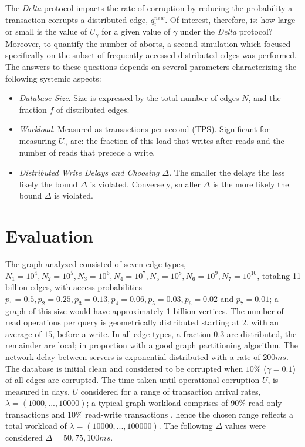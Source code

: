 \documentclass[sigplan,10pt]{acmart}
\begin{document}
The \emph{Delta} protocol impacts the rate of corruption by reducing the probability a transaction corrupts a distributed edge, $q^{new}_i$. Of interest, therefore, is: how large or small is the value of $U_\gamma$ for a given value of $\gamma$ under the \emph{Delta} protocol? Moreover, to quantify the number of aborts, a second simulation which focused specifically on the subset of frequently accessed distributed edges was performed. The answers to these questions depends on several parameters characterizing the following systemic aspects:
\begin{itemize}
\item \emph{Database Size}. Size is expressed by the total number of edges $N$, and the fraction $f$ of distributed edges.
\item \emph{Workload}. Measured as transactions per second (TPS). Significant for measuring $U_{\gamma}$ are: the fraction of this load that writes after reads and the number of reads that precede a write.
\item \emph{Distributed Write Delays and Choosing $\Delta$}. The smaller the delays the less likely the bound $\Delta$ is violated. Conversely, smaller $\Delta$ is the more likely the bound $\Delta$ is violated.
\end{itemize}

\section{Evaluation}
\label{sec:evaluation}

The graph analyzed consisted of seven edge types, $N_1=10^4, N_2=10^5, N_3=10^6, N_4=10^7,  N_5=10^8, N_6=10^9, N_7=10^{10}$, totaling 11 billion edges, with access probabilities $p_1 =0.5, p_2 =0.25, p_3=0.13, p_4=0.06, p_5=0.03, p_6=0.02$ and $p_7 =0.01$; a graph of this size would have approximately 1 billion vertices. The number of read operations per query is geometrically distributed starting at $2$, with an average of $15$, before a write. In all edge types, a fraction $0.3$ are distributed, the remainder are local; in proportion with a good graph partitioning algorithm. The network delay between servers is exponential distributed with a rate of $200ms$. The database is initial clean and considered to be corrupted when $10$\% ($\gamma = 0.1$) of all edges are corrupted. The time taken until operational corruption $U$, is measured in days. $U$ considered for a range of transaction arrival rates, $\lambda = (1000, ..., 10000)$; a typical graph workload comprises of 90\% read-only transactions and 10\% read-write transactions \cite{Angles2020}, hence the chosen range reflects a total workload of $\lambda = (10000, ..., 100000)$. The following $\Delta$ values were considered $\Delta = 50, 75, 100ms$.
\end{document}
